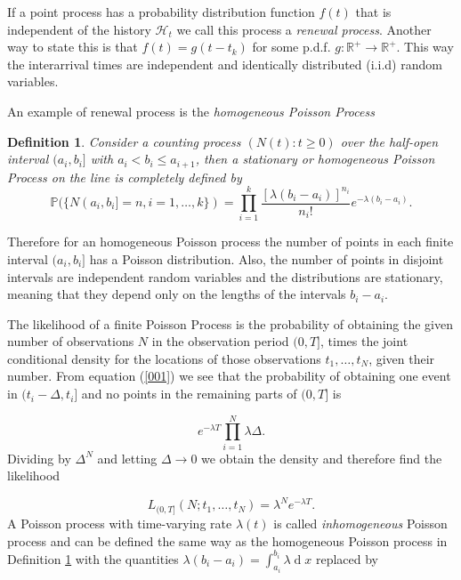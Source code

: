 \documentclass[11pt,a4paper]{article}
\renewcommand{\d}[1]{\ensuremath{\operatorname{d}\!{#1}}}
\newtheorem{definition}{Definition}[section]
\begin{document}
If a point process has a probability distribution function $f(t)$ that is independent of the history $\mathcal{H}_t$ we call this process a \textit{renewal process}. Another way to state this is that $f(t) = g(t - t_k)$ for some p.d.f. $g : \mathbb{R}^+ \rightarrow \mathbb{R}^+$. This way the interarrival times are independent and identically distributed (i.i.d) random variables.

An example of renewal process is the \textit{homogeneous Poisson Process}

\begin{definition}\label{def:HomPoi}
    Consider a counting process $(N(t):t \geq 0)$ over the half-open interval $(a_i, b_i]$ with $a_i < b_i \leq a_{i+1}$, then a \textit{stationary or homogeneous Poisson Process} on the line is completely defined by
    \begin{equation}\label{001}
        \mathbb{P}(\{N(a_i, b_i] = n, i = 1, \dots, k \}) = \prod_{i=1}^k \frac{[\lambda(b_i - a_i)]^{n_i}}{n_i!}e^{-\lambda(b_i-a_i)}.
    \end{equation}
\end{definition}
    
Therefore for an homogeneous Poisson process the number of points in each finite interval $(a_i, b_i]$ has a Poisson distribution. Also, the number of points in disjoint intervals are independent random variables and the distributions are stationary, meaning that they depend only on the lengths of the intervals $b_i - a_i$.

The likelihood of a finite Poisson Process is the probability of obtaining the given number of observations $N$ in the observation period $(0,T]$, times the joint conditional density for the locations of those observations $t_1, \dots, t_N$, given their number. From equation (\ref{001}) we see that the probability of obtaining one event in $(t_i - \Delta, t_i]$ and no points in the remaining parts of $(0, T]$ is

\begin{equation*}
    e^{-\lambda T} \prod_{i=1}^N \lambda \Delta.
\end{equation*}
Dividing by $\Delta^N$ and letting $\Delta \rightarrow 0$ we obtain the density and therefore find the likelihood

\begin{equation*}
    L_{(0, T]}(N;t_1, \dots, t_N) = \lambda^N e^{-\lambda T}.
\end{equation*}
A Poisson process with time-varying rate $\lambda(t)$ is called \textit{inhomogeneous} Poisson process and can be defined the same way as the homogeneous Poisson process in Definition \ref{def:HomPoi} with the quantities $\lambda(b_i - a_i) = \int_{a_i}^{b_i} \lambda \d x$ replaced by
\end{document}

